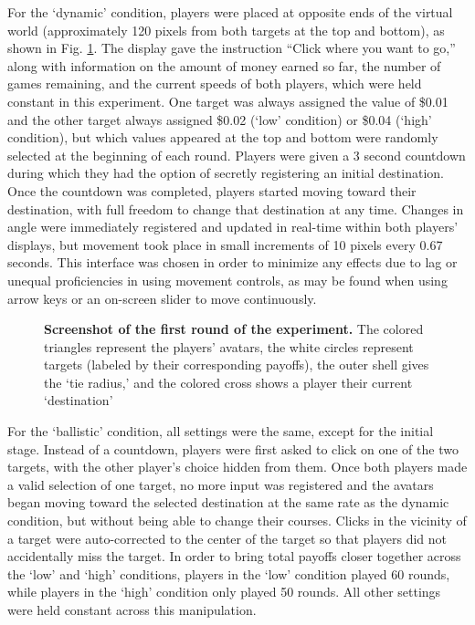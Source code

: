 \documentclass[10pt,letterpaper]{article}
\begin{document}
For the `dynamic' condition, players were placed at opposite ends of the virtual world (approximately 120 pixels from both targets at the top and bottom), as shown in Fig. \ref{ex}. The display gave the instruction ``Click where you want to go,'' along with information on the amount of money earned so far, the number of games remaining, and the current speeds of both players, which were held constant in this experiment. One target was always assigned the value of \$0.01 and the other target always assigned \$0.02 (`low' condition) or \$0.04 (`high' condition), but which values appeared at the top and bottom were randomly selected at the beginning of each round. Players were given a 3 second countdown during which they had the option of secretly registering an initial destination. Once the countdown was completed, players started moving toward their destination, with full freedom to change that destination at any time. Changes in angle were immediately registered and updated in real-time within both players' displays, but movement took place in small increments of 10 pixels every 0.67 seconds. This interface was chosen in order to minimize any effects due to lag or unequal proficiencies in using movement controls, as may be found when using arrow keys or an on-screen slider to move continuously. 

\begin{figure}
\centering
\caption{{\bf Screenshot of the first round of the experiment.} The colored triangles represent the players' avatars, the white circles represent targets (labeled by their corresponding payoffs), the outer shell gives the `tie radius,' and the colored cross shows a player their current `destination'}
\label{ex}
\end{figure}

For the `ballistic' condition, all settings were the same, except for the initial stage. Instead of a countdown, players were first asked to click on one of the two targets, with the other player's choice hidden from them. Once both players made a valid selection of one target, no more input was registered and the avatars began moving toward the selected destination at the same rate as the dynamic condition, but without being able to change their courses. Clicks in the vicinity of a target were auto-corrected to the center of the target so that players did not accidentally miss the target. In order to bring total payoffs closer together across the `low' and `high' conditions, players in the `low' condition played 60 rounds, while players in the `high' condition only played 50 rounds. All other settings were held constant across this manipulation. 
\end{document}
